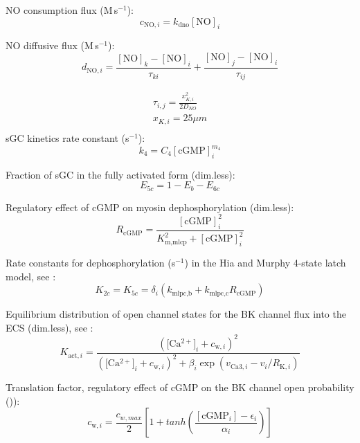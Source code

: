 \documentclass[fleqn]{report}
\numberwithin{equation}{section}
\numberwithin{equation}{section}
\newcommand{\NO}{\text{NO}}
\newcommand{\Cai}{\text{[Ca$^{2+}]_i$}}
\newcommand{\cGMP}{\text{cGMP}}
\newcommand{\uMpers}{\textmu M\,s$^{-1}$}
\newcommand{\n}{$^{-1}$}
\newcommand\cNO[1]{\text{$c_{\text{NO},#1}$}}
\newcommand\dNO[1]{\text{$d_{\text{NO},#1}$}}
\begin{document}
				NO consumption flux (\uMpers):
				\begin{equation} 
					\cNO{i} = k_{\text{dno}} [\NO]_i
				\end{equation}
	
				NO diffusive flux (\uMpers):
				\begin{equation} 
					\dNO{i} = \frac{[\NO]_k - [\NO]_i}{\tau_{ki}} + \frac{[\NO]_j - [\NO]_i}{\tau_{ij}}
				\end{equation}
	
					\begin{eqnarray} 
						\tau_{i,j}=\frac{x_{K,i}^2}{2 D_{NO}}\\
						x_{K,i}=25 \mu m \\
					\end{eqnarray}
				sGC kinetics rate constant (s\n): %
				\begin{equation} 
					k_4 = C_4 [\cGMP]_i^{m_{4}}
				\end{equation}	
				
				Fraction of sGC in the fully activated form (dim.less):%
				\begin{equation} 
					E_{5c} = 1 - E_b - E_{6c}
				\end{equation}	
				
				Regulatory effect of cGMP on myosin dephosphorylation (dim.less):			%
				\begin{equation} 
					R_{\text{cGMP}} = \frac{[\text{cGMP}]_i^2}{K_{\text{m,mlcp}}^2 + [\text{cGMP}]_i^2}
				\end{equation}
				
				Rate constants for dephosphorylation (s\n ) in the Hia and Murphy 4-state latch model, see \citet{Dormanns2016b}:
				\begin{equation} 
					K_{2c} = K_{5c} = \delta_i \left(k_{\text{mlpc,b}} + k_{\text{mlpc,c}} R_{\text{cGMP}}\right)
				\end{equation}	
			
				Equilibrium distribution of open channel states for the BK channel flux into the ECS  (dim.less), see \citet{Dormanns2014}:  %
				\begin{equation} 
					K_{\text{act},i} = \frac{(\Cai + c_{\text{w},i})^2}{(\Cai + c_{\text{w},i})^2 + \beta_i \exp(v_{\text{Ca}3,i} - v_i/R_{\text{K},i} )}
				\end{equation}
				
				Translation factor, regulatory effect of cGMP on the BK channel open probability (\uM)):			
				\begin{equation} 
					c_{\text{w},i} = \frac{c_{w,max}}{2}[1 + tanh( \frac{[\text{cGMP}_i]-\epsilon_i}{\alpha_i})]
				\end{equation}
				
\end{document}
